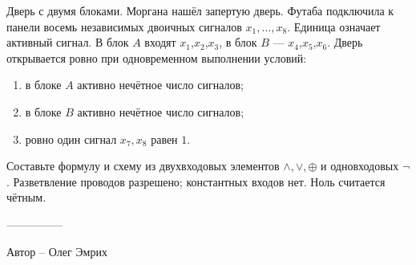 \question
Дверь с двумя блоками. Моргана нашёл запертую дверь. Футаба подключила к панели восемь независимых двоичных сигналов $x_1,\ldots,x_8$. Единица означает активный сигнал. В блок $A$ входят $x_{1}$,$x_{2}$,$x_{3}$, в блок $B$ --- $x_{4}$,$x_{5}$,$x_{6}$. Дверь открывается ровно при одновременном выполнении условий:
\begin{enumerate}
\item в блоке $A$ активно нечётное число сигналов;
\item в блоке $B$ активно нечётное число сигналов;
\item ровно один сигнал $x_7,x_8$ равен $1$.
\end{enumerate}
Составьте формулу и схему из двухвходовых элементов $\land,\lor,\oplus$ и одновходовых $\neg$. Разветвление проводов разрешено; константных входов нет. Ноль считается чётным.

---------------

Автор -- Олег Эмрих
